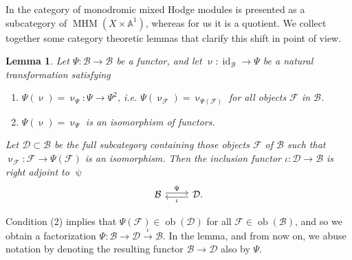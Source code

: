 \documentclass[a4paper,10pt]{amsart}
\renewcommand{\psi}{\uppsi}
\renewcommand{\nu}{\upnu}
\newtheorem{lemma}[theorem]{Lemma}
\DeclareMathOperator{\obj}{ob}
\DeclareMathOperator{\MHM}{MHM}
\DeclareMathOperator{\id}{id}
\begin{document}
In \cite{KS2} the category of monodromic mixed Hodge modules is presented as a subcategory of $\MHM(X\times\mathbb{A}^1)$, whereas for us it is a quotient.  We collect together some category theoretic lemmas that clarify this shift in point of view.
\begin{lemma}
\label{adjLem1}
Let $\Psi\colon \mathcal{B}\rightarrow\mathcal{B}$ be a functor, and let $\nu\colon\id_{\mathcal{B}}\rightarrow \Psi$ be a natural transformation satisfying 
\begin{enumerate}
\item
$\Psi(\nu)=\nu_{\Psi}\colon \Psi\rightarrow \Psi^2$, i.e. $\Psi(\nu_{\mathcal{F}})=\nu_{\Psi(\mathcal{F})}$ for all objects $\mathcal{F}$ in $\mathcal{B}$.
\item
$\Psi(\nu)=\nu_{\Psi}$ is an isomorphism of functors.
\end{enumerate}
Let $\mathcal{D}\subset \mathcal{B}$ be the full subcategory containing those objects $\mathcal{F}$ of $\mathcal{B}$ such that $\nu_{\mathcal{F}}\colon\mathcal{F}\rightarrow \Psi(\mathcal{F})$ is an isomorphism.  Then the inclusion functor $\iota\colon\mathcal{D}\rightarrow \mathcal{B}$ is right adjoint to $\psi$
\begin{equation*}
\begin{tikzcd}
\mathcal{B} \arrow[r,shift left=.5ex,"\Psi"]
&
\mathcal{D}. \arrow[l,shift left=.5ex,"\iota"]
\end{tikzcd}
\end{equation*}
\end{lemma}
Condition (2) implies that $\Psi(\mathcal{F})\in\obj(\mathcal{D})$ for all $\mathcal{F}\in\obj(\mathcal{B})$, and so we obtain a factorization $\Psi\colon\mathcal{B}\rightarrow \mathcal{D}\xrightarrow{\iota}\mathcal{B}$.  In the lemma, and from now on, we abuse notation by denoting the resulting functor $\mathcal{B}\rightarrow\mathcal{D}$ also by $\Psi$.
\end{document}
